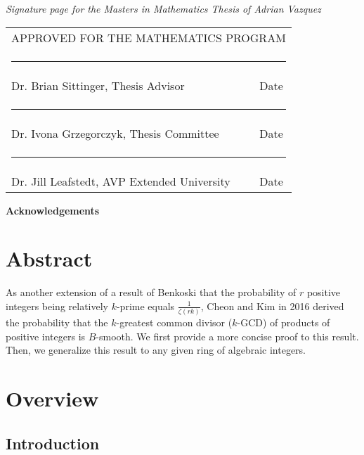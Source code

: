 \documentclass[12pt]{amsart}
\def\name{Adrian Vazquez}
\newcommand{\thesisadvisor}{Dr. Brian Sittinger}
\newcommand{\firstfaculty}{Dr. Ivona Grzegorczyk}
\newcommand{\univefaculty}{Dr. Jill Leafstedt}
\newcommand{\committee}{\vspace*{1.25in} 
\begin{tabular}{ll}
   \multicolumn{2}{c}{\hspace*{2.9cm} APPROVED FOR THE MATHEMATICS PROGRAM}\\[10mm]
   \multicolumn{2}{c}{\hspace*{1.65cm}\rule{4.5in}{.01in}}\\[-4mm]
   \hspace*{3cm}\thesisadvisor, Thesis Advisor \hspace*{0cm}&  Date\\[4mm]
   \multicolumn{2}{c}{\hspace*{1.65cm}\rule{4.5in}{.01in}}\\[-4mm]
   \hspace*{3cm}\firstfaculty, Thesis Committee \hspace*{0cm}&  Date\\[4mm]
   \multicolumn{2}{c}{\hspace*{1.65cm}\rule{4.5in}{.01in}}\\[-4mm]
    \hspace*{3cm}\univefaculty, AVP Extended University \hspace*{0cm}&  Date\\
 \end{tabular}}
\theoremstyle{definition}
\begin{document}
\newpage
 \setlength{\paperheight}{13in}
 \setlength{\topmargin}{1.25cm}

{\center\emph{Signature page for the Masters in Mathematics Thesis of \name}}

\committee


 \newpage
 \setlength{\topmargin}{-0.4375in}
 \setlength{\paperheight}{11.5in}

\newpage

\begin{center}
\vspace*{50mm}
{\bf Acknowledgements}
\end{center}


\newpage

\pagestyle{plain}

\section*{Abstract}
As another extension of a result of Benkoski that the probability of $r$ positive integers being relatively $k$-prime equals $\frac{1}{\zeta(rk)}$, Cheon and Kim in 2016 derived the probability that the $k$-greatest common divisor ($k$-GCD) of products of positive integers is $B$-smooth. We first provide a more concise proof to this result. Then, we generalize this result to any given ring of algebraic integers.

\newpage
\tableofcontents
\newpage
\newpage
{}

\section{Overview}

\subsection{Introduction}
\end{document}
